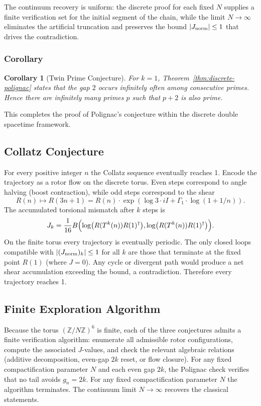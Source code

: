 \documentclass[dvipdfmx,a4paper]{article}
\newtheorem{corollary}[theorem]{Corollary}
\theoremstyle{definition}
\theoremstyle{remark}
\newcommand{\Jnorm}{J_{\rm norm}}
\begin{document}
The continuum recovery is uniform: the discrete proof for each fixed \( N \) supplies a finite verification set for the initial segment of the chain, while the limit \( N \to \infty \) eliminates the artificial truncation and preserves the bound \( |\Jnorm| \leq 1 \) that drives the contradiction.

\subsubsection{Corollary}

\begin{corollary}[Twin Prime Conjecture]
\label{cor:twin-prime}
For \( k = 1 \), Theorem~\ref{thm:discrete-polignac} states that the gap \( 2 \) occurs infinitely often among consecutive primes. Hence there are infinitely many primes \( p \) such that \( p + 2 \) is also prime.
\end{corollary}

This completes the proof of Polignac's conjecture within the discrete double spacetime framework.

\subsection{Collatz Conjecture}

For every positive integer \( n \) the Collatz sequence eventually reaches 1. Encode the trajectory as a rotor flow on the discrete torus. Even steps correspond to angle halving (boost contraction), while odd steps correspond to the shear
\[
R(n) \mapsto R(3n+1) = R(n) \cdot \exp(\log 3 \cdot iI + \Gamma_1 \cdot \log(1 + 1/n)).
\]
The accumulated torsional mismatch after \( k \) steps is
\[
J_k = \frac{1}{16} B\Bigl( \log\bigl(R(T^k(n)) R(1)^\dagger\bigr), \log\bigl(R(T^k(n)) R(1)^\dagger\bigr) \Bigr).
\]
On the finite torus every trajectory is eventually periodic. The only closed loops compatible with \( |(\Jnorm)_k| \leq 1 \) for all \( k \) are those that terminate at the fixed point \( R(1) \) (where \( J = 0 \)). Any cycle or divergent path would produce a net shear accumulation exceeding the bound, a contradiction. Therefore every trajectory reaches 1.

\subsection{Finite Exploration Algorithm}

Because the torus \( (\mathbb{Z}/N\mathbb{Z})^6 \) is finite, each of the three conjectures admits a finite verification algorithm: enumerate all admissible rotor configurations, compute the associated \( J \)-values, and check the relevant algebraic relations (additive decomposition, even-gap \( 2k \) reset, or flow closure). For any fixed compactification parameter \( N \) and each even gap \( 2k \), the Polignac check verifies that no tail avoids \( g_n = 2k \). For any fixed compactification parameter \( N \) the algorithm terminates. The continuum limit \( N \to \infty \) recovers the classical statements.
\end{document}
